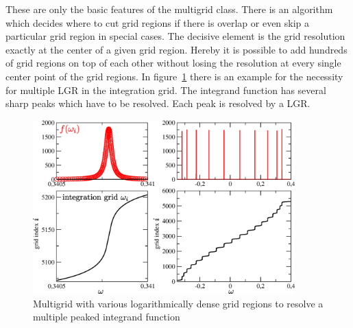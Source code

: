 These are only the basic features of the multigrid class. There is an algorithm which decides where to cut grid regions if there is overlap or even skip a particular grid region in special cases. The decisive element is the grid resolution exactly at the center of a given grid region. Hereby it is possible to add hundreds of grid regions on top of each other without losing the resolution at every single center point of the grid regions. In figure~\ref{fig:multiple_lgr} there is an example for the necessity for multiple LGR in the integration grid. The integrand function has several sharp peaks which have to be resolved. Each peak is resolved by a LGR.
\begin{figure}[h]
	\centering
	\includegraphics[width=0.9\textwidth]{pics/multiple_loggridregions.eps}
	\caption{Multigrid with various logarithmically dense grid regions to resolve a multiple peaked integrand function}
	\label{fig:multiple_lgr}
\end{figure}